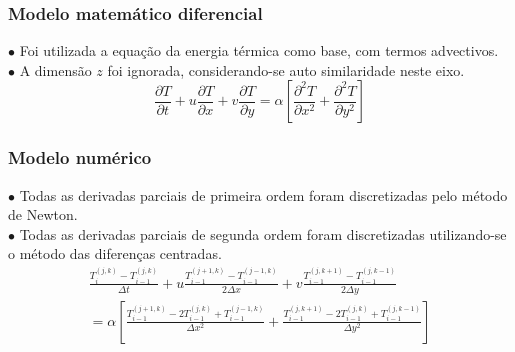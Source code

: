 \documentclass[xcolor=dvipsnames,10pt,aspectratio=169]{beamer}
\begin{document}
	
	\begin{frame} 
	\frametitle{Modelo matemático diferencial}
		$\bullet$ Foi utilizada a equação da energia térmica como base, com termos advectivos.\\
		$\bullet$ A dimensão $z$ foi ignorada, considerando-se auto similaridade neste eixo.\\
		
	
	\begin{equation}
	\frac{\partial T}{\partial t} + u \frac{\partial T}{\partial x} + v \frac{\partial T}{\partial y} = \alpha \left[  \frac{\partial^2 T}{\partial x^2} + \frac{\partial^2 T}{\partial y^2}   \right] 
	\end{equation}
	
	\end{frame}






	\begin{frame} 
	\frametitle{Modelo numérico}
	$\bullet$ Todas as derivadas parciais de primeira ordem foram discretizadas pelo método de Newton.\\
	$\bullet$ Todas as derivadas parciais de segunda ordem foram discretizadas utilizando-se o método das diferenças centradas.\\
	
	
	\begin{equation}
	\begin{split}
	\frac{T_i^{(j,k)} - T_{i -1}^{(j,k)} }{\Delta t} + u \frac{T_{i -1}^{(j+1,k)} - T_{i -1}^{(j - 1,k)}}{2 \Delta x} + v \frac{T_{i -1}^{(j,k+1)} - T_{i -1}^{(j,k - 1)}}{2 \Delta y}  \\ 
	= \alpha \left[  \frac{T_{i -1}^{(j+1,k)} - 2 T_{i -1}^{(j,k)} + T_{i -1}^{(j - 1,k)} }{\Delta x^2} + \frac{T_{i -1}^{(j,k + 1)} - 2 T_{i -1}^{(j,k)} + T_{i -1}^{(j,k - 1)}}{\Delta y^2}   \right] 
	\end{split}
	\end{equation}
	
	\end{frame}
\end{document}
